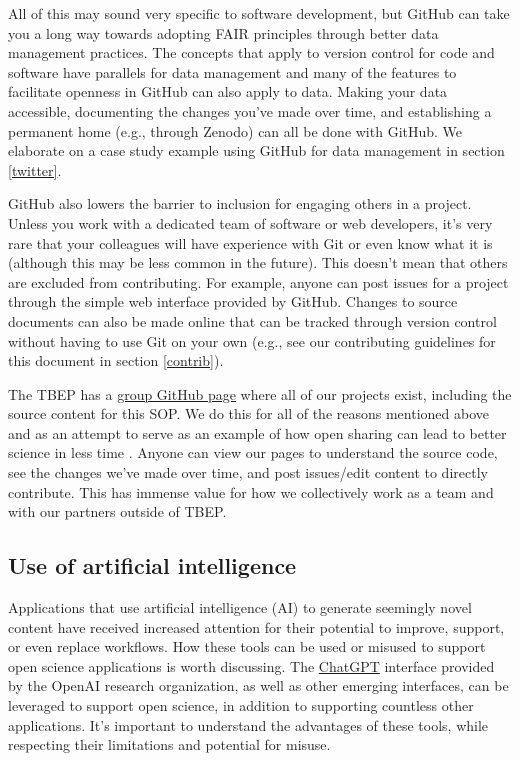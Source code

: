 \documentclass[
]{book}
\begin{document}
All of this may sound very specific to software development, but GitHub can take you a long way towards adopting FAIR principles through better data management practices. The concepts that apply to version control for code and software have parallels for data management and many of the features to facilitate openness in GitHub can also apply to data. Making your data accessible, documenting the changes you've made over time, and establishing a permanent home (e.g., through Zenodo) can all be done with GitHub. We elaborate on a case study example using GitHub for data management in section \ref{twitter}.

GitHub also lowers the barrier to inclusion for engaging others in a project. Unless you work with a dedicated team of software or web developers, it's very rare that your colleagues will have experience with Git or even know what it is (although this may be less common in the future). This doesn't mean that others are excluded from contributing. For example, anyone can post issues for a project through the simple web interface provided by GitHub. Changes to source documents can also be made online that can be tracked through version control without having to use Git on your own (e.g., see our contributing guidelines for this document in section \ref{contrib}).

The TBEP has a \href{https://github.com/tbep-tech}{group GitHub page} where all of our projects exist, including the source content for this SOP. We do this for all of the reasons mentioned above and as an attempt to serve as an example of how open sharing can lead to better science in less time \citep{Lowndes17}. Anyone can view our pages to understand the source code, see the changes we've made over time, and post issues/edit content to directly contribute. This has immense value for how we collectively work as a team and with our partners outside of TBEP.

\hypertarget{aiuse}{%
\subsection{Use of artificial intelligence}\label{aiuse}}

Applications that use artificial intelligence (AI) to generate seemingly novel content have received increased attention for their potential to improve, support, or even replace workflows. How these tools can be used or misused to support open science applications is worth discussing. The \href{https://chat.openai.com/}{ChatGPT} interface provided by the OpenAI research organization, as well as other emerging interfaces, can be leveraged to support open science, in addition to supporting countless other applications. It's important to understand the advantages of these tools, while respecting their limitations and potential for misuse.
\end{document}
